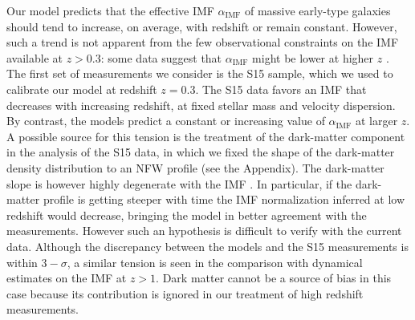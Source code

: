 \documentclass[usenatbib]{mnras}
\def\aimf{\alpha_{\mathrm{IMF}}}
\begin{document}
Our model predicts that the effective IMF $\aimf$ of massive
  early-type galaxies should tend to increase, on average, with
  redshift or remain constant. However, such a trend is not apparent
  from the few observational constraints on the IMF available at
  $z>0.3$: some data suggest that $\aimf$ might be lower at higher
  $z$ \citep[see also][]{Tor++14}. The first set of measurements we consider is the S15 sample,
which we used to calibrate our model at redshift $z=0.3$. The S15 data
favors an IMF that decreases with increasing redshift, at fixed
stellar mass and velocity dispersion. By contrast, the models predict
a constant or increasing value of $\aimf$ at larger $z$.  A possible
source for this tension is the treatment of the dark-matter component
in the analysis of the S15 data, in which we fixed the shape of
  the dark-matter density distribution to an NFW profile (see the
  Appendix). The dark-matter slope is however highly degenerate with
the IMF \citep[see e.g.][]{Aug++10}. In particular, if the
  dark-matter profile is getting steeper with time the IMF
  normalization inferred at low redshift would decrease, bringing the
  model in better agreement with the measurements. However such an
  hypothesis is difficult to verify with the current data.  Although
  the discrepancy between the models and the S15 measurements is
  within $3-\sigma$, a similar tension is seen in the comparison with
  dynamical estimates on the IMF at $z>1$.  Dark matter cannot be a
  source of bias in this case because its contribution is ignored in
  our treatment of high redshift measurements.

\end{document}

